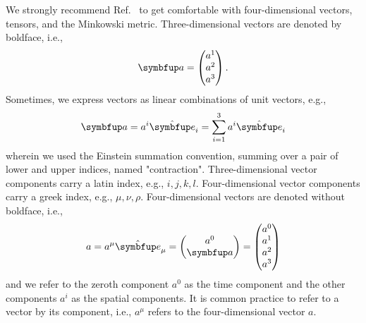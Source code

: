 We strongly recommend Ref.~\cite{Carroll1997} to get comfortable with four-dimensional vectors, tensors, and the Minkowski metric.
Three-dimensional vectors are denoted by boldface, i.e.,
\begin{equation*}
	\vb{a}
	=
	\begin{pmatrix}
		a^1 \\
		a^2 \\
		a^3
	\end{pmatrix}
	.
\end{equation*}
Sometimes, we express vectors as linear combinations of unit vectors, e.g.,
\begin{equation*}
	\vb{a}
	=
	a^i
	\vu{e}_i
	=
	\sum_{i=1}^3
	a^i
	\vu{e}_i
\end{equation*}
wherein we used the Einstein summation convention, summing over a pair of lower and upper indices, named "contraction".
Three-dimensional vector components carry a latin index, e.g., $i,j,k,l$.
Four-dimensional vector components carry a greek index, e.g., $\mu,\nu,\rho$.
Four-dimensional vectors are denoted without boldface, i.e.,
\begin{equation*}
	a
	=
	a^\mu
	\vu{e}_\mu
	=
	\begin{pmatrix}
		a^0 \\
		\vb{a}
	\end{pmatrix}
	=
	\begin{pmatrix}
		a^0 \\
		a^1 \\
		a^2 \\
		a^3
	\end{pmatrix}
\end{equation*}
and we refer to the zeroth component $a^0$ as the time component and the other components $a^i$ as the spatial components.
It is common practice to refer to a vector by its component, i.e., $a^\mu$ refers to the four-dimensional vector $a$.

